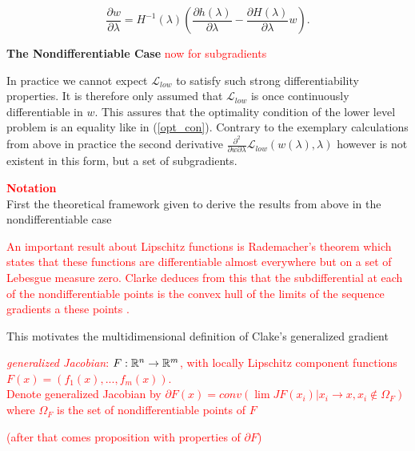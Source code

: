 \begin{equation*}
	\frac{\partial w}{\partial \lambda} = H^{-1}(\lambda)\left(\frac{\partial h(\lambda)}{\partial \lambda}-\frac{\partial H(\lambda)}{\partial \lambda}w\right).
\end{equation*}


\textbf{The Nondifferentiable Case}
\textcolor{red}{now for subgradients}

In practice we cannot expect \(\mathcal{L}_{low}\) to satisfy such strong differentiability properties.
It is therefore only assumed that \(\mathcal{L}_{low}\) is once continuously differentiable in \(w\). This assures that the optimality condition of the lower level problem is an equality like in (\ref{opt_con}).
Contrary to the exemplary calculations from above in practice the second derivative \(\frac{\partial^2}{\partial w \partial \lambda} \mathcal{L}_{low}(w(\lambda),\lambda)\) however is not existent in this form, but a set of subgradients.



\textcolor{red}{\textbf{Notation}}\\
First the theoretical framework given to derive the results from above in the nondifferentiable case



\textcolor{red}{An important result about Lipschitz functions is Rademacher's theorem which states that these functions are differentiable almost everywhere but on a set of Lebesgue measure zero\cite[Theorem 3.1]{Heinonen2004}. 
Clarke deduces from this that the subdifferential at each of the nondifferentiable points is the convex hull of the limits of the sequence gradients a these points \cite[see Theorem 2.5.1]{Clarke1990}.}

This motivates the multidimensional definition of Clake's generalized gradient 

\textcolor{red}{
\begin{definition}
	\emph{generalized Jacobian}: \(F:\mathbb{R}^n \to \mathbb{R}^m\), with locally Lipschitz component functions \(F(x) = (f_1(x),...,f_m(x))\).\\
	Denote generalized Jacobian by \(\partial F(x) = conv\left(\lim JF(x_i)|x_i\to x, x_i \notin \Omega_F \right) \) where \(\Omega_F\) is the set of nondifferentiable points of \(F\)
\end{definition}
(after that comes proposition with properties of \(\partial F\))}


